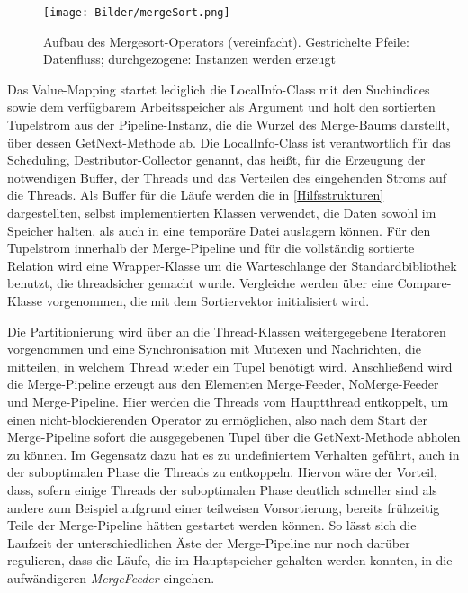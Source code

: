 \documentclass[a4paper,12pt,twoside]{article}
\newcommand{\Fb}[1]{\textit{#1}} %
\begin{document}
\begin{figure}
	\centering
	\texttt{[image: Bilder/mergeSort.png]}
	\caption{Aufbau des Mergesort-Operators (vereinfacht). Gestrichelte Pfeile: Datenfluss; durchgezogene: Instanzen werden erzeugt}
	\label{img:KlassSort}
\end{figure}


Das Value-Mapping startet lediglich die LocalInfo-Class mit den Suchindices sowie dem verfügbarem Arbeitsspeicher als Argument und holt den sortierten Tupelstrom aus der Pipeline-Instanz, die die Wurzel des Merge-Baums darstellt, über dessen GetNext-Methode ab. Die LocalInfo-Class ist verantwortlich für das Scheduling, Destributor-Collector genannt, das heißt, für die Erzeugung der notwendigen Buffer, der Threads und das Verteilen des eingehenden Stroms auf die Threads. Als Buffer für die Läufe werden die in \autoref{Hilfsstrukturen} dargestellten, selbst implementierten Klassen verwendet, die Daten sowohl im Speicher halten, als auch in eine temporäre Datei auslagern können. Für den Tupelstrom innerhalb der Merge-Pipeline und für die vollständig sortierte Relation wird eine Wrapper-Klasse um die Warteschlange der Standardbibliothek benutzt, die threadsicher gemacht wurde. Vergleiche werden über eine Compare-Klasse vorgenommen, die mit dem Sortiervektor initialisiert wird.

Die Partitionierung wird über an die Thread-Klassen weitergegebene Iteratoren vorgenommen und eine Synchronisation mit Mutexen und Nachrichten, die mitteilen, in welchem Thread wieder ein Tupel benötigt wird. Anschließend wird die Merge-Pipeline erzeugt aus den Elementen Merge-Feeder, NoMerge-Feeder und Merge-Pipeline. Hier werden die Threads vom Hauptthread entkoppelt, um einen nicht-blockierenden Operator zu ermöglichen, also nach dem Start der Merge-Pipeline sofort die ausgegebenen Tupel über die GetNext-Methode abholen zu können. Im Gegensatz dazu hat es zu undefiniertem Verhalten geführt, auch in der suboptimalen Phase die Threads zu entkoppeln. Hiervon wäre der Vorteil, dass, sofern einige Threads der suboptimalen Phase deutlich schneller sind als andere zum Beispiel aufgrund einer teilweisen Vorsortierung, bereits frühzeitig Teile der Merge-Pipeline hätten gestartet werden können. So lässt sich die Laufzeit der unterschiedlichen Äste der Merge-Pipeline nur noch darüber regulieren, dass die Läufe, die im Hauptspeicher gehalten werden konnten, in die aufwändigeren \Fb{MergeFeeder} eingehen.
\end{document}

